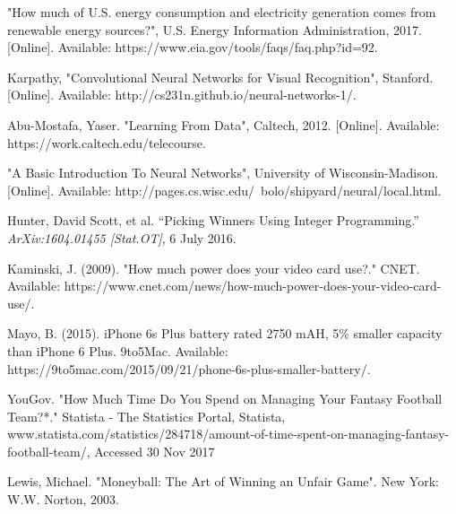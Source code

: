 \begin{thebibliography}{9}
"How much of U.S. energy consumption and electricity generation comes from renewable energy sources?", U.S. Energy Information Administration, 2017. [Online]. Available: https://www.eia.gov/tools/faqs/faq.php?id=92.

Karpathy, "Convolutional Neural Networks for Visual Recognition", Stanford. [Online]. Available: http://cs231n.github.io/neural-networks-1/.

Abu-Mostafa, Yaser. "Learning From Data", Caltech, 2012. [Online]. Available: https://work.caltech.edu/telecourse.

"A Basic Introduction To Neural Networks", University of Wisconsin-Madison. [Online]. Available: http://pages.cs.wisc.edu/~bolo/shipyard/neural/local.html.


Hunter, David Scott, et al. “Picking Winners Using Integer Programming.” \textit{ArXiv:1604.01455 [Stat.OT]}, 6 July 2016.

Kaminski, J. (2009). "How much power does your video card use?." CNET. Available: https://www.cnet.com/news/how-much-power-does-your-video-card-use/.

Mayo, B. (2015). iPhone 6s Plus battery rated 2750 mAH, 5\% smaller capacity than iPhone 6 Plus. 9to5Mac. Available: https://9to5mac.com/2015/09/21/phone-6s-plus-smaller-battery/.

YouGov. "How Much Time Do You Spend on Managing Your Fantasy Football Team?*." Statista - The Statistics Portal, Statista, www.statista.com/statistics/284718/amount-of-time-spent-on-managing-fantasy-football-team/, Accessed 30 Nov 2017

Lewis, Michael. "Moneyball: The Art of Winning an Unfair Game". New York: W.W. Norton, 2003.

\end{thebibliography}